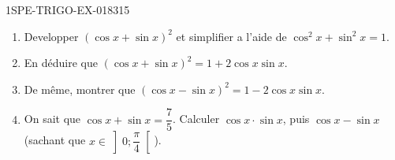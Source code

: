 \begin{exercice}{1SPE-TRIGO-EX-018}{3}{15}
\begin{enumerate}
  \item Developper $(\cos x + \sin x)^2$ et simplifier a l'aide de $\cos^2 x + \sin^2 x = 1$.
  \item En déduire que $(\cos x + \sin x)^2 = 1 + 2\cos x \sin x$.
  \item De même, montrer que $(\cos x - \sin x)^2 = 1 - 2\cos x \sin x$.
  \item On sait que $\cos x + \sin x = \dfrac{7}{5}$. Calculer $\cos x \cdot \sin x$, puis $\cos x - \sin x$ (sachant que $x \in \left]0;\dfrac{\pi}{4}\right[$).
\end{enumerate}
\end{exercice}
